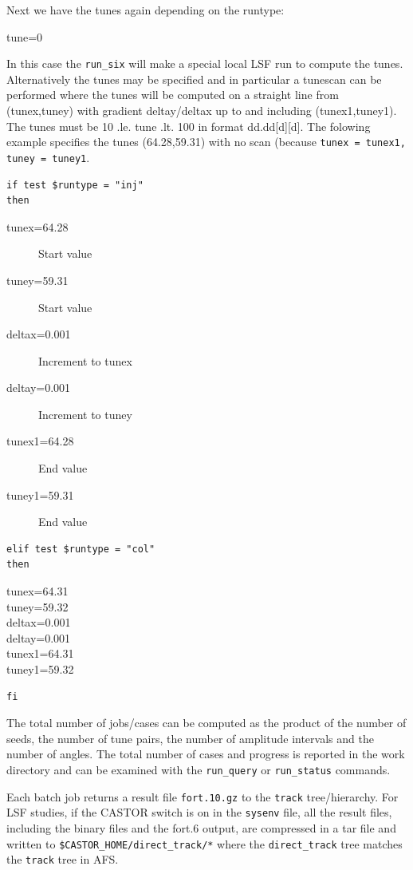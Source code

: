 \documentclass{cernatsnote}    %
\begin{document}
Next we have the tunes again depending on the runtype:
\begin{description} 
\item[tune=0]
\end{description} 
In this case the {\tt run\_six} will make a special local LSF run
to compute the tunes. Alternatively the tunes may be specified
and in particular a tunescan can be performed where 
the tunes will be computed on a straight line from
(tunex,tuney) with gradient deltay/deltax up to and including (tunex1,tuney1).
The tunes must be 10 .le. tune .lt. 100 in format dd.dd[d][d].
The folowing example specifies the tunes (64.28,59.31) with no scan
(because {\tt tunex = tunex1, tuney = tuney1}. 
\begin{verbatim}
if test $runtype = "inj"
then
\end{verbatim}
\begin{description}
\item[tunex=64.28] Start value
\item[tuney=59.31] Start value
\item[deltax=0.001] Increment to tunex
\item[deltay=0.001] Increment to tuney
\item[tunex1=64.28] End value
\item[tuney1=59.31] End value
\end{description}
\begin{verbatim}
elif test $runtype = "col"
then
\end{verbatim}
\begin{description}
\item[tunex=64.31]
\item[tuney=59.32]
\item[deltax=0.001]
\item[deltay=0.001]
\item[tunex1=64.31]
\item[tuney1=59.32]
\end{description}
\begin{verbatim}
fi
\end{verbatim}
The total number of jobs/cases can be computed as the product of the number of
seeds, the number of tune pairs, the number of amplitude intervals 
and the number of angles.
The total number of cases and progress is reported in the work directory and
can be examined with the {\tt run\_query} or {\tt run\_status} commands. 

Each batch job returns a result file {\tt fort.10.gz} to the {\tt track}
tree/hierarchy. For LSF studies, if the CASTOR switch is on in the {\tt sysenv} file,
all the result files, including the binary files and the fort.6 output, 
are compressed in a tar file and written to 
{\tt \$CASTOR\_HOME/direct\_track/*} where the 
{\tt direct\_track} tree matches the {\tt track} tree in AFS.
\end{document}
